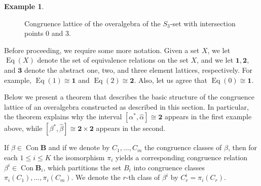 \documentclass{au}
\numberwithin{equation}{section}
\theoremstyle{plain}
\theoremstyle{definition}
\newtheorem{example}[theorem]{Example}
\newcommand{\<}{\ensuremath{\langle}}
\renewcommand{\>}{\ensuremath{\rangle}}
\newcommand{\bB}{\ensuremath{\mathbf{B}}}
\DeclareMathOperator{\Eq}{Eq}
\DeclareMathOperator{\Con}{Con}
\renewcommand{\leq}{\ensuremath{\leqslant}}
\newcommand{\eps}{\ensuremath{\varepsilon}}
\newcommand{\one}{\ensuremath{\mathbf{1}}}
\newcommand{\two}{\ensuremath{\mathbf{2}}}
\newcommand{\three}{\ensuremath{\mathbf{3}}}
\newcommand{\dotsize}{1.0pt}%
\begin{document}
\begin{example}
\begin{figure}[h!]
  \centering
  \caption{Congruence lattice of the overalgebra of the $S_3$-set with
    intersection points 0 and 3.}
  \label{fig:OverAlgebra-S3-0-3}
\end{figure}

\end{example}


Before proceeding, we require some more notation.  Given a
set $X$, we let $\Eq(X)$ denote the set of equivalence relations on the set $X$, and
we let $\one, \two$, and $\three$ denote the abstract one, two,
and three element lattices, respectively. For example, $\Eq(1) \cong
\one$ and $\Eq(2) \cong \two$.  Also, let us agree that
$\Eq(0) \cong \one$.

Below we present a theorem that describes the basic structure of the congruence
lattice of an overalgebra constructed as described in this
section.  In particular, the theorem explains why the interval
$[\alpha^*, \widehat{\alpha}]\cong\two $ appears in the first example above,
while $[\beta^*, \widehat{\beta}]\cong\two\times \two $ appears
in the second.

If $\beta \in \Con \bB$ and if we
denote by $C_1, \dots, C_m$ the congruence classes of $\beta$, then
for each $1\leq i\leq K$ the isomorphism $\pi_i$ yields a corresponding
congruence relation $\beta^i \in \Con \bB_i$, which partitions the set
$B_i$ into congruence classes $\pi_i(C_1), \dots, \pi_i(C_m)$.  We
denote the $r$-th class of $\beta^i$ by $C_r^i=\pi_i(C_r)$.
\end{document}
